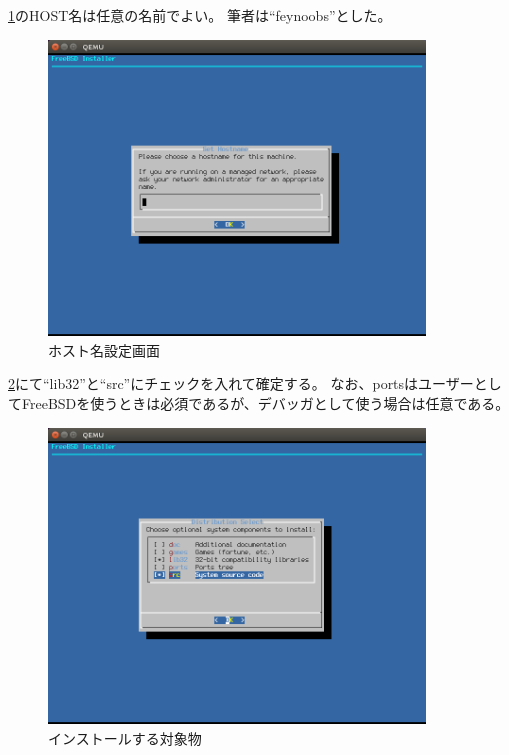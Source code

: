 \documentclass[a4j]{jarticle}
\begin{document}
\ref{fig:FreeBSD_HOST}のHOST名は任意の名前でよい。
筆者は``feynoobs''とした。
\begin{figure}[htbp]
	\centering
	\includegraphics[width=10cm]{./IMG/FreeBSD_HOST.png}
    \caption{ホスト名設定画面}
    \label{fig:FreeBSD_HOST}
\end{figure}

\ref{fig:FreeBSD_INST_SELECT}にて``lib32''と``src''にチェックを入れて確定する。
なお、portsはユーザーとしてFreeBSDを使うときは必須であるが、デバッガとして使う場合は任意である。
\begin{figure}[htbp]
	\centering
	\includegraphics[width=10cm]{./IMG/FreeBSD_INST.png}
    \caption{インストールする対象物}
    \label{fig:FreeBSD_INST_SELECT}
\end{figure}
\end{document}
